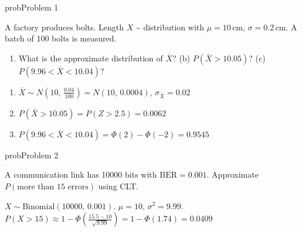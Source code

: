 \begin{PSbox}[unbreakable]{prob}{Problem 1}

A factory produces bolts. Length $X$ \textasciitilde{} distribution with $\mu = 10\,\mathrm{cm},\, \sigma = 0.2\,\mathrm{cm}$. A batch of 100 bolts is measured.

\begin{enumerate}
\def\labelenumi{(\alph{enumi})}
\tightlist
\item
  What is the approximate distribution of $\bar{X}$? (b) $P(\bar{X} > 10.05)$? (c) $P(9.96 < \bar{X} < 10.04)$?
\end{enumerate}

\PSsolution{} 

\begin{enumerate}
\def\labelenumi{(\alph{enumi})}
\tightlist
\item
  $\displaystyle \bar{X} \sim N\left(10,\, \frac{0.04}{100}\right) = N(10,\, 0.0004),\, \sigma_{\bar{X}} = 0.02$
\item
  $P(\bar{X} > 10.05) = P(Z > 2.5) = 0.0062$
\item
  $P(9.96 < \bar{X} < 10.04) = \Phi (2) - \Phi (-2) = 0.9545$
\end{enumerate}

\end{PSbox}

\begin{PSbox}[unbreakable]{prob}{Problem 2}

A communication link has 10000 bits with $\mathrm{BER} = 0.001$. Approximate $P(\text{more than 15 errors})$ using CLT.

\PSsolution{} $X \sim \mathrm{Binomial}(10000,\, 0.001)$. $\mu = 10,\, \sigma^{2} = 9.99$.\PSbr{}$\displaystyle P(X > 15) \approx 1 - \Phi \left(\frac{15.5-10}{\sqrt{9.99}}\right) = 1 - \Phi (1.74) = 0.0409$

\end{PSbox}

